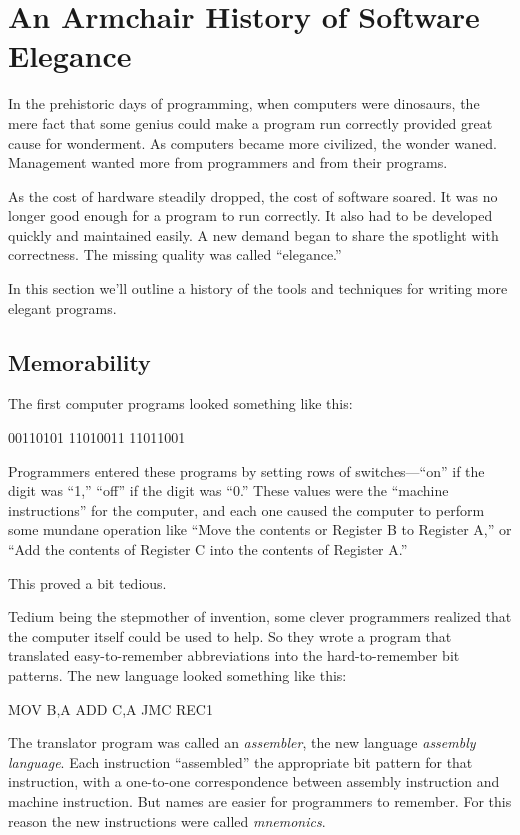 \section{An Armchair History of Software Elegance}

In the prehistoric days of programming, when computers were dinosaurs,
the mere fact that some genius could make a program run correctly
provided great cause for wonderment. As computers became more
civilized, the wonder waned. Management wanted more from programmers
and from their programs.

As the cost of hardware steadily dropped, the cost of software soared.
It was no longer good enough for a program to run correctly. It also
had to be developed quickly and maintained easily. A new demand began
to share the spotlight with correctness.  The missing quality was
called ``elegance.''

In this section we'll outline a history of the tools and techniques
for writing more elegant programs.

\subsection{Memorability}
The first computer programs looked something like this:%
\begin{Code}
00110101
11010011
11011001
\end{Code}
Programmers entered these programs by setting rows of
switches---``on'' if the digit was ``1,'' ``off'' if the digit was ``0.''
These values were the ``machine instructions'' for the computer, and
each one caused the computer to perform some mundane operation like
``Move the contents or Register B to Register A,'' or ``Add the
contents of Register C into the contents of Register A.''

This proved a bit tedious.

Tedium being the stepmother of invention, some clever programmers
realized that the computer itself could be used to help.  So they
wrote a program that translated easy-to-remember
abbreviations into the hard-to-remember bit
patterns. The new language looked something like this:
\begin{Code}
MOV B,A
ADD C,A
JMC REC1
\end{Code}
The translator program was called an
\emph{assembler},
the new language
\emph{assembly language}.
Each instruction ``assembled'' the appropriate bit pattern for that
instruction, with a one-to-one correspondence between assembly
instruction and machine instruction.  But names are easier for
programmers to remember. For this reason the new instructions were called
\emph{mnemonics}.%


